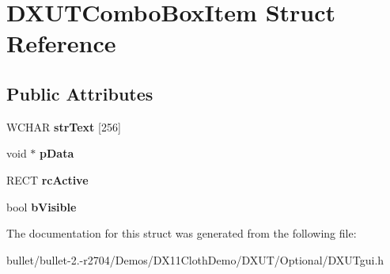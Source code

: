 \hypertarget{struct_d_x_u_t_combo_box_item}{\section{D\+X\+U\+T\+Combo\+Box\+Item Struct Reference}
\label{struct_d_x_u_t_combo_box_item}
}
\subsection*{Public Attributes}
\begin{DoxyCompactItemize}
\item 
\hypertarget{struct_d_x_u_t_combo_box_item_add4f4ff25c0414b3b9c11425f54739a2}{W\+C\+H\+A\+R {\bfseries str\+Text} \mbox{[}256\mbox{]}}\label{struct_d_x_u_t_combo_box_item_add4f4ff25c0414b3b9c11425f54739a2}

\item 
\hypertarget{struct_d_x_u_t_combo_box_item_a62ebde50a72cf8b28aaedab5f942fc13}{void $\ast$ {\bfseries p\+Data}}\label{struct_d_x_u_t_combo_box_item_a62ebde50a72cf8b28aaedab5f942fc13}

\item 
\hypertarget{struct_d_x_u_t_combo_box_item_a805429e07edf6e00edaab721af4fdc95}{R\+E\+C\+T {\bfseries rc\+Active}}\label{struct_d_x_u_t_combo_box_item_a805429e07edf6e00edaab721af4fdc95}

\item 
\hypertarget{struct_d_x_u_t_combo_box_item_a1eb68d408cc0c561ecbcb86648bfef62}{bool {\bfseries b\+Visible}}\label{struct_d_x_u_t_combo_box_item_a1eb68d408cc0c561ecbcb86648bfef62}

\end{DoxyCompactItemize}


The documentation for this struct was generated from the following file\+:\begin{DoxyCompactItemize}
\item 
bullet/bullet-\/2.-\/r2704/\+Demos/\+D\+X11\+Cloth\+Demo/\+D\+X\+U\+T/\+Optional/D\+X\+U\+Tgui.\+h\end{DoxyCompactItemize}
